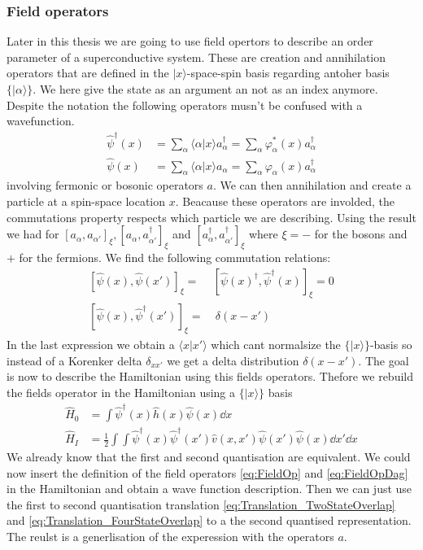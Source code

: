 \documentclass[../main.tex]{subfile}
\begin{document}
\subsubsection{Field operators}
Later in this thesis we are going to use field opertors to describe an order parameter of a superconductive system. These are 
creation and annihilation operators that are defined in the $|x\rangle$-space-spin basis regarding antoher basis $\{|\alpha\rangle\}$. We here give the state as an argument
an not as an index anymore. Despite the notation the following operators musn't be confused with a wavefunction.
\begin{align}
    \hat{\psi}^{\dagger}(x) &= \sum_{\alpha} \langle\alpha|x\rangle a_{\alpha}^{\dagger} = \sum_{\alpha} \varphi_{\alpha}^{\ast}(x) a_{\alpha}^{\dagger} \label{eq:FieldOp}\\ 
    \hat{\psi}(x) &= \sum_{\alpha} \langle\alpha|x\rangle a_{\alpha} = \sum_{\alpha} \varphi_{\alpha}(x) a_{\alpha}^{\dagger}\label{eq:FieldOpDag}
\end{align}
involving fermonic or bosonic operators $a$. We can then annihilation and create a particle at a spin-space location $x$. Beacause these operators
are involded, the commutations property respects which particle we are describing. Using the result we had for $[a_{\alpha}, a_{\alpha'}]_{\xi},
[a_{\alpha}, a_{\alpha'}^{\dagger}]_{\xi}$ and $[a_{\alpha}^{\dagger}, a_{\alpha'}^{\dagger}]_{\xi}$ where $\xi = -$ for the bosons and $+$ for the fermions. We find the following commutation relations:
\begin{align*}
    \left[\hat{\psi}(x), \hat{\psi}(x')\right]_{\xi} = & \left[\hat{\psi}(x)^{\dagger}, \hat{\psi}^{\dagger}(x)\right]_{\xi} = 0 \\
    \left[\hat{\psi}(x), \hat{\psi}^{\dagger}(x')\right]_{\xi} = &~ \delta(x-x')
\end{align*}
In the last expression we obtain a $\langle x | x '\rangle$ which cant normalsize the $\{|x\rangle\}$-basis so instead of a Korenker delta $\delta_{xx'}$
we get a delta distribution $\delta(x-x')$.
The goal is now to describe the Hamiltonian using this fields operators. Thefore we rebuild the fields operator in the Hamiltonian using a $\{|x\rangle\}$ basis
\begin{align*}
    \hat{H}_0 &=  \int \hat{\psi}^{\dagger}(x) \hat{h}(x)\hat{\psi}(x) \dd x\\
    \hat{H}_I &= \frac{1}{2} \int \int  \hat{\psi}^{\dagger}(x) \hat{\psi}^{\dagger}(x') \hat{v}(x,x')\hat{\psi}(x') \hat{\psi}(x) \dd x' \dd x
\end{align*}
We already know that the first and second quantisation are equivalent. We could now insert the definition of the field operators \ref{eq:FieldOp} and \ref{eq:FieldOpDag}
in the Hamiltonian and obtain a wave function description. Then we can just use the first to second quantisation translation \ref{eq:Translation_TwoStateOverlap} and \ref{eq:Translation_FourStateOverlap}
to a the second quantised representation. The reulst is a generlisation of the experession with the operators $a$.\\
\end{document}
